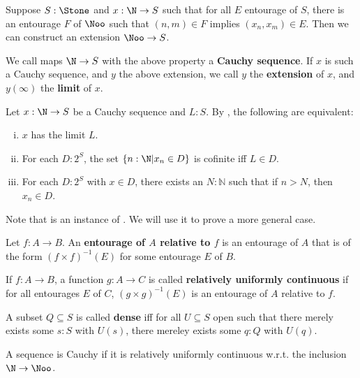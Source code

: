 \begin{corollary}\label{BabyExtension}
  Suppose $S:\Stone$ and $x:\N \to S$ such that for all $E$ entourage of $S$, there is an entourage $F$ of $\Noo$ such that $(n,m)\in F$ implies $(x_n,x_m)\in E$. 
  Then we can construct an extension $\Noo \to S$. 
\end{corollary}
\begin{definition}
  We call maps $\N \to S$ with the above property a \textbf{Cauchy sequence}. If $x$ is such a Cauchy sequence, and $y$ the above extension, we call $y$ the \textbf{extension} of $x$, and $y(\infty)$ the \textbf{limit} of $x$. 
\end{definition}
\begin{remark}
 Let $x: \N \to S$ be a Cauchy sequence and $L:S$.   By , the following are equivalent:
  \begin{enumerate}[(i)]
    \item\label{Llimit} $x$ has the limit $L$. 
    \item\label{Lcofinite} For each $D:2^S$, the set $\{n : \N | x_n \in D\}$ is cofinite iff $L\in D$. 
    \item\label{Lcofinal} For each $D:2^S$ with $x\in D$, there exists an $N:\mathbb N$ such that if $n>N$, then $x_n \in D$. 
  \end{enumerate}
\end{remark}

Note that  is an instance of . We will use it to prove a more general case. 

\begin{definition}
  \item Let $f:A \to B$. An \textbf{entourage of $A$ relative to $f$} is an entourage of $A$ that is of the form $(f\times f)^{-1} (E)$ for some entourage $E$ of $B$. 

  \item If $f: A \to B$, a function $g:A \to C$ is called \textbf{relatively uniformly continuous} if for all entourages $E$ of $C$, $(g\times g)^{-1}(E)$ is an entourage of $A$ relative to $f$. 
  \item A subset $Q\subseteq S$ is called \textbf{dense} iff for all $U\subseteq S$ open such that there merely exists some $s:S$ with $U(s)$, there mereley exists some $q:Q$ with $U(q)$. 
\end{definition}
\begin{remark}\label{rmkRelativeUniformContinuousIffCauchy}
  A sequence is Cauchy if it is relatively uniformly continuous w.r.t. the inclusion $\N \to \Noo$. 
\end{remark}

